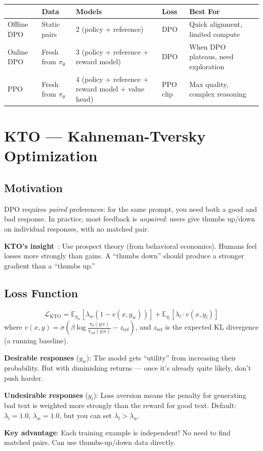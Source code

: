 \begin{tabular}{@{}llp{4.5cm}lp{4.5cm}@{}}
\toprule
 & \textbf{Data} & \textbf{Models} & \textbf{Loss} & \textbf{Best For} \\
\midrule
Offline DPO & Static pairs & 2 (policy + reference) & DPO & Quick alignment, limited compute \\
Online DPO & Fresh from $\pi_\theta$ & 3 (policy + reference + reward model) & DPO & When DPO plateaus, need exploration \\
PPO & Fresh from $\pi_\theta$ & 4 (policy + reference + reward model + value head) & PPO clip & Max quality, complex reasoning \\
\bottomrule
\end{tabular}

\section{KTO --- Kahneman-Tversky Optimization}
\label{sec:kto}

\subsection{Motivation}
\label{motivation-1}

DPO requires \emph{paired} preferences: for the same prompt, you need both a good and bad response. In practice, most feedback is \emph{unpaired}: users give thumbs up/down on individual responses, with no matched pair.

\textbf{KTO’s insight}~\cite{ethayarajh2024kto}: Use prospect theory (from behavioral economics). Humans feel losses more strongly than gains. A ``thumbs down'' should produce a stronger gradient than a ``thumbs up.''

\subsection{Loss Function}
\label{loss-function}

\begin{equation}
\boxed{\mathcal{L}_\text{KTO} = \mathbb{E}_{y_w}\left[\lambda_w (1 - v(x, y_w))\right] + \mathbb{E}_{y_l}\left[\lambda_l \cdot v(x, y_l)\right]}
\end{equation}
 where $v(x,y) = \sigma\left(\beta \log\frac{\pi_\theta(y|x)}{\pi_\text{ref}(y|x)} - z_\text{ref}\right)$, and $z_\text{ref}$ is the expected KL divergence (a running baseline).

\begin{intuitionbox}
\textbf{Desirable responses} ($y_w$): The model gets ``utility'' from increasing their probability. But with diminishing returns --- once it’s already quite likely, don’t push harder.

\textbf{Undesirable responses} ($y_l$): Loss aversion means the penalty for generating bad text is weighted more strongly than the reward for good text. Default: $\lambda_l = 1.0$, $\lambda_w = 1.0$, but you can set $\lambda_l > \lambda_w$.

\textbf{Key advantage}: Each training example is independent! No need to find matched pairs. Can use thumbs-up/down data directly.
\end{intuitionbox}

